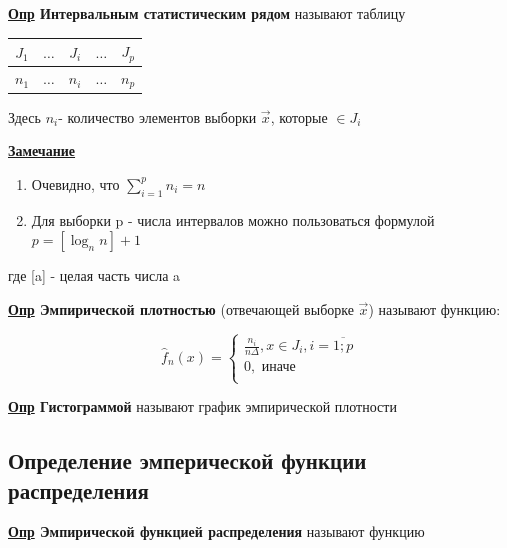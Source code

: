 \documentclass[12pt, a4paper]{report}
\begin{document}
	\vspace{0.5cm}\textbf{\underline{Опр} Интервальным статистическим рядом} называют таблицу
	
	\begin{table}[H]
		\centering
		\begin{tabular}{|c|c|c|c|c|}
			\hline
			$J_1$ & $\dots$ & $J_i$ & $\dots$ & $J_p$ \\
			\hline
			$n_1$ & $\dots$ & $n_i$ & $\dots$ & $n_p$ \\
			\hline
		\end{tabular}
	\end{table}
	
	Здесь $n_i$- количество элементов выборки $\vec{x}$, которые $\in J_i$
	
	\vspace{0.3cm}\textbf{\underline{Замечание}}
	
	\begin{enumerate}
		\item Очевидно, что $\sum_{i=1}^p n_i = n$
		\item Для выборки p - числа интервалов можно пользоваться формулой $p = [\log_n n]+1$
	\end{enumerate}
	
	где [a] - целая часть числа a
	
	\vspace{0.5cm}\textbf{\underline{Опр} Эмпирической плотностью} (отвечающей выборке $\vec{x}$) называют функцию:
	
	\begin{equation*}
	\hat f_n(x) =
	\begin{cases}
	\frac{n_i}{n \Delta}, x \in J_i, i = \overline{1; p} \\
	0, \text{ иначе} \\
	\end{cases}
	\end{equation*}
	
	\textbf{\underline{Опр} Гистограммой} называют график эмпирической плотности
	
	
	\vspace{0.5cm}
	\subsection{Определение эмперической функции распределения}
	
	\hspace{0.5cm}
	
	\textbf{\underline{Опр} Эмпирической функцией распределения} называют функцию
	
\end{document}
